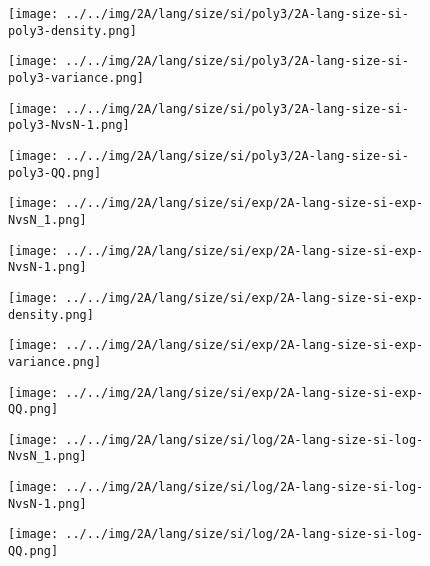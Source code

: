 \begin{figure}[H]
\centering	\texttt{[image: ../../img/2A/lang/size/si/poly3/2A-lang-size-si-poly3-density.png]}
\end{figure}
\begin{figure}[H]
\centering	\texttt{[image: ../../img/2A/lang/size/si/poly3/2A-lang-size-si-poly3-variance.png]}
\end{figure}
\begin{figure}[H]
\centering	\texttt{[image: ../../img/2A/lang/size/si/poly3/2A-lang-size-si-poly3-NvsN-1.png]}
\end{figure}
\begin{figure}[H]
\centering	\texttt{[image: ../../img/2A/lang/size/si/poly3/2A-lang-size-si-poly3-QQ.png]}
\end{figure}
\begin{figure}[H]
\centering	\texttt{[image: ../../img/2A/lang/size/si/exp/2A-lang-size-si-exp-NvsN\_1.png]}
\end{figure}
\begin{figure}[H]
\centering	\texttt{[image: ../../img/2A/lang/size/si/exp/2A-lang-size-si-exp-NvsN-1.png]}
\end{figure}
\begin{figure}[H]
\centering	\texttt{[image: ../../img/2A/lang/size/si/exp/2A-lang-size-si-exp-density.png]}
\end{figure}
\begin{figure}[H]
\centering	\texttt{[image: ../../img/2A/lang/size/si/exp/2A-lang-size-si-exp-variance.png]}
\end{figure}
\begin{figure}[H]
\centering	\texttt{[image: ../../img/2A/lang/size/si/exp/2A-lang-size-si-exp-QQ.png]}
\end{figure}
\begin{figure}[H]
\centering	\texttt{[image: ../../img/2A/lang/size/si/log/2A-lang-size-si-log-NvsN\_1.png]}
\end{figure}
\begin{figure}[H]
\centering	\texttt{[image: ../../img/2A/lang/size/si/log/2A-lang-size-si-log-NvsN-1.png]}
\end{figure}
\begin{figure}[H]
\centering	\texttt{[image: ../../img/2A/lang/size/si/log/2A-lang-size-si-log-QQ.png]}
\end{figure}
